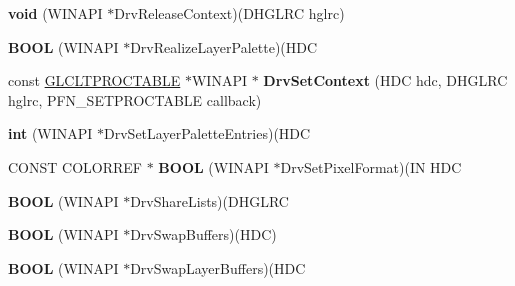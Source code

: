 \begin{DoxyCompactItemize}
\item 
\mbox{\label{struct_i_c_d___data_ae4d355cea98207e45407c7050ba880f4}} 
{\bfseries void} (W\+I\+N\+A\+PI $\ast$Drv\+Release\+Context)(D\+H\+G\+L\+RC hglrc)
\item 
\mbox{\label{struct_i_c_d___data_adddf89286853f4b073a62bcd9527ccf0}} 
{\bfseries B\+O\+OL} (W\+I\+N\+A\+PI $\ast$Drv\+Realize\+Layer\+Palette)(H\+DC
\item 
\mbox{\label{struct_i_c_d___data_a6046772be0e2af80dc2ba3d628fd3b31}} 
const \hyperlink{struct___g_l_c_l_t_p_r_o_c_t_a_b_l_e}{G\+L\+C\+L\+T\+P\+R\+O\+C\+T\+A\+B\+LE} $\ast$W\+I\+N\+A\+PI $\ast$ {\bfseries Drv\+Set\+Context} (H\+DC hdc, D\+H\+G\+L\+RC hglrc, P\+F\+N\+\_\+\+S\+E\+T\+P\+R\+O\+C\+T\+A\+B\+LE callback)
\item 
\mbox{\label{struct_i_c_d___data_a094cc2d3d86b9cdf37810f306908d64b}} 
{\bfseries int} (W\+I\+N\+A\+PI $\ast$Drv\+Set\+Layer\+Palette\+Entries)(H\+DC
\item 
\mbox{\label{struct_i_c_d___data_adec3aade82af7814e1bf621e48b0d4f8}} 
C\+O\+N\+ST C\+O\+L\+O\+R\+R\+EF $\ast$ {\bfseries B\+O\+OL} (W\+I\+N\+A\+PI $\ast$Drv\+Set\+Pixel\+Format)(IN H\+DC
\item 
\mbox{\label{struct_i_c_d___data_a12694b0efd48ffea2b83cb4dfc505a5f}} 
{\bfseries B\+O\+OL} (W\+I\+N\+A\+PI $\ast$Drv\+Share\+Lists)(D\+H\+G\+L\+RC
\item 
\mbox{\label{struct_i_c_d___data_a5c790fa0a1b85c4ba7fa7840bb83dc4a}} 
{\bfseries B\+O\+OL} (W\+I\+N\+A\+PI $\ast$Drv\+Swap\+Buffers)(H\+DC)
\item 
\mbox{\label{struct_i_c_d___data_abb4e22ba4244ac6eba4fd20d3f8e0263}} 
{\bfseries B\+O\+OL} (W\+I\+N\+A\+PI $\ast$Drv\+Swap\+Layer\+Buffers)(H\+DC
\end{DoxyCompactItemize}

